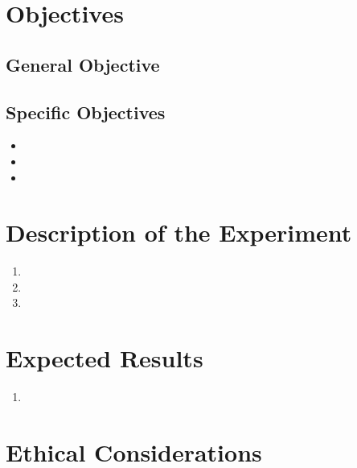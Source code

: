 \documentclass[11pt]{article}
\begin{document}
\section{Objectives}

\subsection{General Objective}

\subsection{Specific Objectives}
\begin{itemize}
    \item
    \item
    \item
\end{itemize}

\section{Description of the Experiment}

\begin{enumerate}[label=Step \arabic*.]
    \item
    \item
    \item
\end{enumerate}

\section{Expected Results}

\begin{enumerate}
    \item
\end{enumerate}

\section{Ethical Considerations}
\end{document}
